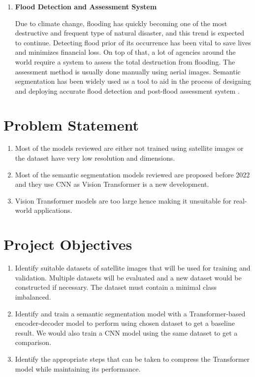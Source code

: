 \begin{enumerate}
    \item \textbf{Flood Detection and Assessment System}
    
    Due to climate change, flooding has quickly becoming one of the most destructive and frequent type of natural disaster, and this trend is expected to continue. Detecting flood prior of its occurrence has been vital to save lives and minimizes financial loss. On top of that, a lot of agencies around the world require a system to assess the total  destruction from flooding. The assessment method is usually done manually using aerial images. Semantic segmentation has been widely used as a tool to aid in the process of designing and deploying accurate flood detection and post-flood assessment system \cite{edseee.988427220220717}. 
\end{enumerate}

\section{Problem Statement}

\begin{enumerate}
    \item Most of the models reviewed are either not trained using satellite images or the dataset have very low resolution and dimensions. 
    \item Most of the semantic segmentation models reviewed are proposed before 2022 and they use CNN as Vision Transformer is a new development.  
    \item Vision Transformer models are too large hence making it unsuitable for real-world applications.
    \end{enumerate}


\section{Project Objectives}
\begin{enumerate}
    \item Identify suitable datasets of satellite images that will be used for training and validation. Multiple datasets will be evaluated and a new dataset would be constructed if necessary. The dataset must contain a minimal class imbalanced.
    \item Identify and train a semantic segmentation model with a Transformer-based encoder-decoder model to perform using chosen dataset to get a baseline result. We would also train a CNN model using the same dataset to get a comparison.
    \item Identify the appropriate steps that can be taken to compress the Transformer model while maintaining its performance.
\end{enumerate}
